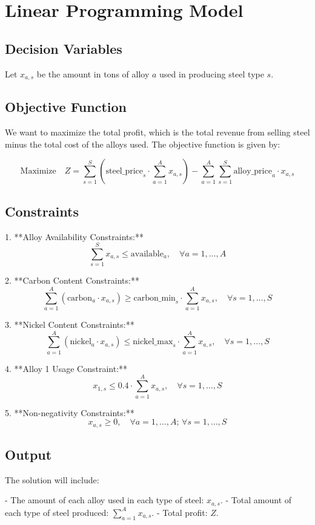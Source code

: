 \documentclass{article}
\begin{document}
\section*{Linear Programming Model}

\subsection*{Decision Variables}
Let \( x_{a,s} \) be the amount in tons of alloy \( a \) used in producing steel type \( s \).

\subsection*{Objective Function}
We want to maximize the total profit, which is the total revenue from selling steel minus the total cost of the alloys used. The objective function is given by:

\[
\text{Maximize} \quad Z = \sum_{s=1}^{S} \left( \text{steel\_price}_s \cdot \sum_{a=1}^{A} x_{a,s} \right) - \sum_{a=1}^{A} \sum_{s=1}^{S} \text{alloy\_price}_a \cdot x_{a,s}
\]

\subsection*{Constraints}

1. **Alloy Availability Constraints:**
   \[
   \sum_{s=1}^{S} x_{a,s} \leq \text{available}_a, \quad \forall a = 1, \ldots, A
   \]

2. **Carbon Content Constraints:**
   \[
   \sum_{a=1}^{A} \left( \text{carbon}_a \cdot x_{a,s} \right) \geq \text{carbon\_min}_s \cdot \sum_{a=1}^{A} x_{a,s}, \quad \forall s = 1, \ldots, S
   \]

3. **Nickel Content Constraints:**
   \[
   \sum_{a=1}^{A} \left( \text{nickel}_a \cdot x_{a,s} \right) \leq \text{nickel\_max}_s \cdot \sum_{a=1}^{A} x_{a,s}, \quad \forall s = 1, \ldots, S
   \]

4. **Alloy 1 Usage Constraint:**
   \[
   x_{1,s} \leq 0.4 \cdot \sum_{a=1}^{A} x_{a,s}, \quad \forall s = 1, \ldots, S
   \]

5. **Non-negativity Constraints:**
   \[
   x_{a,s} \geq 0, \quad \forall a = 1, \ldots, A; \, \forall s = 1, \ldots, S
   \]

\subsection*{Output}
The solution will include:

- The amount of each alloy used in each type of steel: \( x_{a,s} \).
- Total amount of each type of steel produced: \( \sum_{a=1}^{A} x_{a,s} \).
- Total profit: \( Z \).
\end{document}

